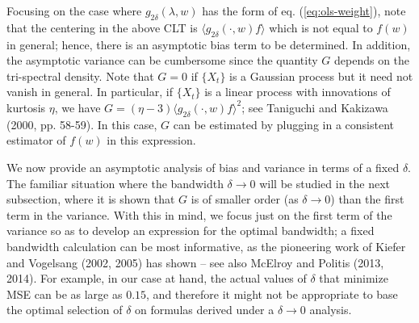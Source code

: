 \documentclass[12p E.Lt,psfig]{article} %
\def\tends{\rightarrow}
\begin{document}
  \begin{Remark} \rm
  \label{rem:local-spec-clt}
Focusing on  the case 
where $ g_{2 \delta} ( \lambda, w)$ has the form of eq. (\ref{eq:ols-weight}),
note that the centering in the above CLT is $\langle g_{2 \delta} ( \cdot, w)  f \rangle $ which 
is not equal to $f(w)$ in general; hence, there is an asymptotic bias term to be
  determined.  In addition, the asymptotic variance can be cumbersome since the quantity 
   $G$  depends on the tri-spectral density. Note that
   $G = 0$  if $\{ X_t \}$ is a  Gaussian process but it need not vanish in general. 
In particular, if $\{ X_t \}$ is a linear process with innovations of kurtosis $\eta$,
  we have $G = (\eta - 3)  { \langle g_{2 \delta}( \cdot, w) f \rangle }^2$; see
   Taniguchi and Kakizawa (2000, pp. 58-59). In this case,  $G$ can be estimated  by plugging in 
a consistent estimator of $f(w)$ in this expression.
 
\end{Remark}
 

   We now provide an asymptotic analysis of bias and variance in terms of a fixed $\delta $.
      The familiar situation where the bandwidth $\delta \tends 0$ will be studied  in the next subsection,
   where it is shown that $G$ is of smaller order (as $\delta \tends 0$) than the first term in the variance.  
  With this in mind, we  focus just  on the first term of the variance
   so as to develop an expression for the optimal bandwidth;
   a fixed bandwidth calculation can be most informative, as  
    the pioneering work of Kiefer   and  Vogelsang   (2002, 2005) has shown -- see also
   McElroy and Politis (2013, 2014). 
   For example, in our case at hand, 
    the  actual values of $\delta$ that minimize MSE can be as large as $0.15$,
    and therefore it might not be appropriate   
    to base the optimal selection of $\delta$ on formulas derived under a $\delta \tends 0$
    analysis. 
\end{document}
